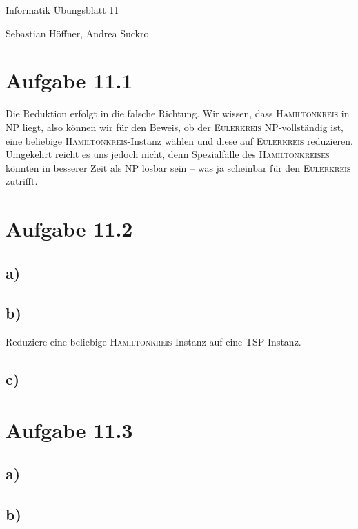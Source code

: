 \documentclass{article}
\begin{document}
\begin{center}
  \Large{Informatik \raisebox{0.05em}{:} Übungsblatt 11}

  \large{Sebastian Höffner, Andrea Suckro}
\end{center}



\section*{Aufgabe 11.1}
Die Reduktion erfolgt in die falsche Richtung. Wir wissen, dass \textsc{Hamiltonkreis} in NP liegt, also können wir für den Beweis, ob der \textsc{Eulerkreis} NP-vollständig ist, eine beliebige \textsc{Hamiltonkreis}-Instanz wählen und diese auf \textsc{Eulerkreis} reduzieren. Umgekehrt reicht es uns jedoch nicht, denn Spezialfälle des \textsc{Hamiltonkreises} könnten in besserer Zeit als NP lösbar sein -- was ja scheinbar für den \textsc{Eulerkreis} zutrifft.



\section*{Aufgabe 11.2}
\subsection*{a)}



\subsection*{b)}
Reduziere eine beliebige \textsc{Hamiltonkreis}-Instanz auf eine \textsc{TSP}-Instanz.


\subsection*{c)}



\section*{Aufgabe 11.3}
\subsection*{a)}


\subsection*{b)}
\end{document}
